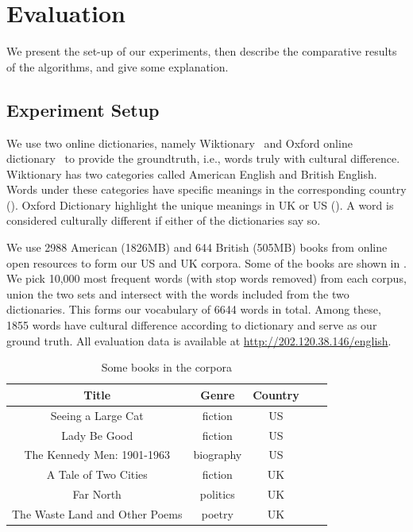 \section{Evaluation}

We present the set-up of our experiments, then
describe the comparative results of the algorithms,
and give some explanation.

\subsection{Experiment Setup}

We use two online dictionaries, namely Wiktionary~\cite{wiktionary} and
Oxford online dictionary~\cite{oxford}
to provide the groundtruth, i.e., words truly with cultural difference.
Wiktionary has two categories called American English and British English.
Words under these categories have specific meanings in the
corresponding country ().
Oxford Dictionary highlight the unique meanings in UK or US ().
A word is considered culturally different if either of the dictionaries say
so.

We use 2988 American (1826MB) and 644 British (505MB) books from online
open resources to form our US and UK corpora.
Some of the books are shown in .
We pick 10,000 most frequent words (with stop words removed) from each corpus,
union the two sets and intersect with the words included from the two
dictionaries. This forms our vocabulary of 6644 words in total.
Among these, 1855 words have cultural difference according to dictionary and
serve as our ground truth. All evaluation data is available at
\url{http://202.120.38.146/english}.


\begin{table}[th]
\small
\begin{tabular}{|c|c|c|c|c|}
\hline
Title & Genre & Country\\ \hline
\hline
Seeing a Large Cat & fiction & US\\
\hline
Lady Be Good & fiction & US\\
\hline
The Kennedy Men: 1901-1963 & biography & US\\
\hline
A Tale of Two Cities & fiction & UK\\
\hline
Far North & politics & UK \\
\hline
The Waste Land and Other Poems & poetry &  UK \\
\hline
\end{tabular}
\caption{Some books in the corpora}
\label{tab:books}
\end{table}

